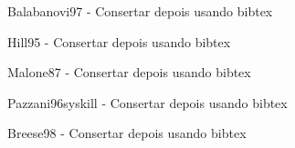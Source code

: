 \begin{thebibliography}{99}
 Balabanovi97 - Consertar depois usando bibtex

 Hill95 - Consertar depois usando bibtex

 Malone87 - Consertar depois usando bibtex

 Pazzani96syskill - Consertar depois usando bibtex

 Breese98 - Consertar depois usando bibtex

\end{thebibliography}
